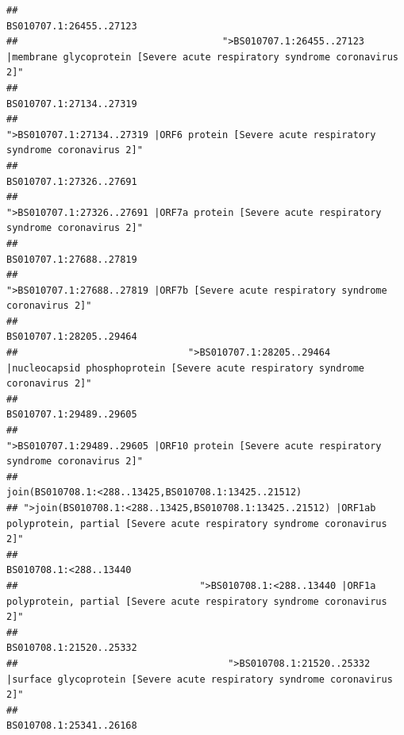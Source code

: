 \documentclass[
]{article}
\begin{document}
\begin{verbatim}
##                                                                                                                BS010707.1:26455..27123 
##                                    ">BS010707.1:26455..27123 |membrane glycoprotein [Severe acute respiratory syndrome coronavirus 2]" 
##                                                                                                                BS010707.1:27134..27319 
##                                             ">BS010707.1:27134..27319 |ORF6 protein [Severe acute respiratory syndrome coronavirus 2]" 
##                                                                                                                BS010707.1:27326..27691 
##                                            ">BS010707.1:27326..27691 |ORF7a protein [Severe acute respiratory syndrome coronavirus 2]" 
##                                                                                                                BS010707.1:27688..27819 
##                                                    ">BS010707.1:27688..27819 |ORF7b [Severe acute respiratory syndrome coronavirus 2]" 
##                                                                                                                BS010707.1:28205..29464 
##                              ">BS010707.1:28205..29464 |nucleocapsid phosphoprotein [Severe acute respiratory syndrome coronavirus 2]" 
##                                                                                                                BS010707.1:29489..29605 
##                                            ">BS010707.1:29489..29605 |ORF10 protein [Severe acute respiratory syndrome coronavirus 2]" 
##                                                                                   join(BS010708.1:<288..13425,BS010708.1:13425..21512) 
## ">join(BS010708.1:<288..13425,BS010708.1:13425..21512) |ORF1ab polyprotein, partial [Severe acute respiratory syndrome coronavirus 2]" 
##                                                                                                                 BS010708.1:<288..13440 
##                                ">BS010708.1:<288..13440 |ORF1a polyprotein, partial [Severe acute respiratory syndrome coronavirus 2]" 
##                                                                                                                BS010708.1:21520..25332 
##                                     ">BS010708.1:21520..25332 |surface glycoprotein [Severe acute respiratory syndrome coronavirus 2]" 
##                                                                                                                BS010708.1:25341..26168 

\end{verbatim}
\end{document}

